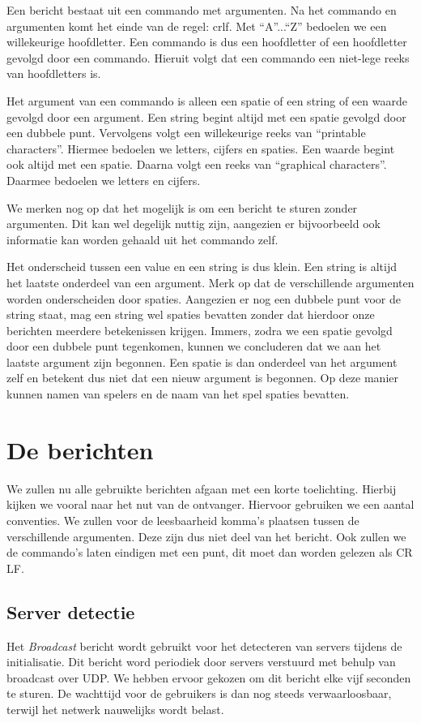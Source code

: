 \documentclass[a4paper,11pt]{article}
\begin{document}
    Een bericht bestaat uit een commando met argumenten. Na het commando en argumenten komt het einde van de regel: crlf. Met ``A''...``Z'' bedoelen we een willekeurige hoofdletter. Een commando is dus een hoofdletter of een hoofdletter gevolgd door een commando. Hieruit volgt dat een commando een niet-lege reeks van hoofdletters is.

    Het argument van een commando is alleen een spatie of een string of een waarde gevolgd door een argument. Een string begint altijd met een spatie gevolgd door een dubbele punt. Vervolgens volgt een willekeurige reeks van ``printable characters''. Hiermee bedoelen we letters, cijfers en spaties. Een waarde begint ook altijd met een spatie. Daarna volgt een reeks van ``graphical characters''. Daarmee bedoelen we letters en cijfers.

    We merken nog op dat het mogelijk is om een bericht te sturen zonder argumenten. Dit kan wel degelijk nuttig zijn, aangezien er bijvoorbeeld ook informatie kan worden gehaald uit het commando zelf.

    Het onderscheid tussen een value en een string is dus klein. Een string is altijd het laatste onderdeel van een argument. Merk op dat de verschillende argumenten worden onderscheiden door spaties. Aangezien er nog een dubbele punt voor de string staat, mag een string wel spaties bevatten zonder dat hierdoor onze berichten meerdere betekenissen krijgen. Immers, zodra we een spatie gevolgd door een dubbele punt tegenkomen, kunnen we concluderen dat we aan het laatste argument zijn begonnen. Een spatie is dan onderdeel van het argument zelf en betekent dus niet dat een nieuw argument is begonnen. Op deze manier kunnen namen van spelers en de naam van het spel spaties bevatten.

    \section{De berichten}
    We zullen nu alle gebruikte berichten afgaan met een korte toelichting. Hierbij kijken we vooral naar het nut van de ontvanger. Hiervoor gebruiken we een aantal conventies. We zullen voor de leesbaarheid komma's plaatsen tussen de verschillende argumenten. Deze zijn dus niet deel van het bericht. Ook zullen we de commando's laten eindigen met een punt, dit moet dan worden gelezen als CR LF.

    \subsection{Server detectie}
    Het \emph{Broadcast} bericht wordt gebruikt voor het detecteren van servers tijdens de initialisatie. Dit bericht word periodiek door servers verstuurd met behulp van broadcast over UDP. We hebben ervoor gekozen om dit bericht elke vijf seconden te sturen. De wachttijd voor de gebruikers is dan nog steeds verwaarloosbaar, terwijl het netwerk nauwelijks wordt belast.
\end{document}
